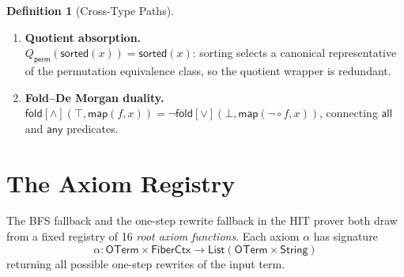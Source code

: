 \documentclass[11pt,a4paper]{report}
\theoremstyle{definition}
\newtheorem{definition}{Definition}[chapter]
\theoremstyle{plain}
\newcommand{\fold}{\mathsf{fold}}
\begin{document}
\begin{definition}[Cross-Type Paths]
\begin{enumerate}
  \item \textbf{Quotient absorption.}\\
    $Q_{\mathsf{perm}}(\mathsf{sorted}(x)) = \mathsf{sorted}(x)$:
    sorting selects a canonical representative of the permutation
    equivalence class, so the quotient wrapper is redundant.

  \item \textbf{Fold--De Morgan duality.}\\
    $\fold[\land](\top, \mathsf{map}(f, x)) =
    \lnot \fold[\lor](\bot, \mathsf{map}(\lnot \circ f, x))$,
    connecting $\mathsf{all}$ and $\mathsf{any}$ predicates.
\end{enumerate}
\end{definition}

\section{The Axiom Registry}
\label{sec:axiom-registry}

The BFS fallback and the one-step rewrite fallback in the HIT prover
both draw from a fixed registry of 16 \emph{root axiom functions}.
Each axiom $\alpha$ has signature
\[
  \alpha : \mathsf{OTerm} \times \mathsf{FiberCtx}
  \longrightarrow \mathsf{List}(\mathsf{OTerm} \times \mathsf{String})
\]
returning all possible one-step rewrites of the input term.
\end{document}
